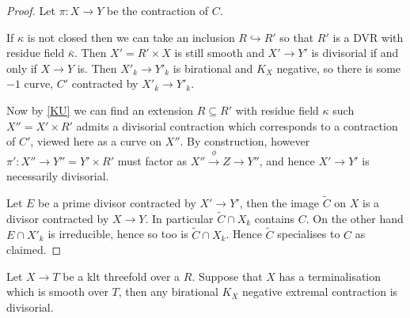 	\begin{proof}
		
		Let $\pi:X \to Y$ be the contraction of $C$. 
		
		If $\kappa$ is not closed then we can take an inclusion $R \hookrightarrow R'$ so that $R'$ is a DVR with residue field $\bar{\kappa}$. Then $X'=R'\times X$ is still smooth and $X' \to Y'$ is divisorial if and only if $X \to Y$ is. Then $X'_{k} \to Y'_{k}$ is birational and $K_{X}$ negative, so there is some $-1$ curve, $C'$ contracted by $X'_{k} \to Y'_{k}$. 
		
		Now by \autoref{KU} we can find an extension $R \subseteq R'$ with residue field $\kappa$ such $X''=X'\times R'$ admits a divisorial contraction which corresponds to a contraction of $C'$, viewed here as a curve on $X''$. By construction, however $\pi':X'' \to Y''=Y'\times R'$ must factor as $X''\xrightarrow{\phi} Z \to Y''$, and hence $X' \to Y'$ is necessarily divisorial.
		
		Let $E$ be a prime divisor contracted by $X' \to Y'$, then the image $\tilde{C}$ on $X$ is a divisor contracted by $X \to Y$. In particular $\tilde{C} \cap X_{k}$ contains $C$. On the other hand $E\cap X'_{k}$ is irreducible, hence so too is $\tilde{C} \cap X_{k}$. Hence $\tilde{C}$ specialises to $C$ as claimed.

	\end{proof}

	\begin{lemma}\label{lifting}
		
		Let $X \to T$ be a klt threefold over a $R$. Suppose that $X$ has a terminalisation which is smooth over $T$, then any birational $K_{X}$ negative extremal contraction is divisorial.
		
	\end{lemma}
	
